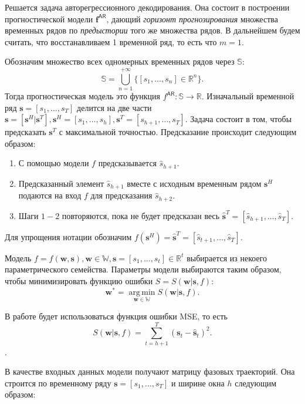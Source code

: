 \documentclass[12pt, twoside]{article}
\DeclareMathOperator*{\argmin}{arg\,min}
\begin{document}
\begin{comment}
\end{comment}

Решается задача авторегрессионного декодирования. Она состоит в построении прогностической модели $\mathbf{f}^{\mathsf{AR}}$, дающий \textit{горизонт прогнозирования} множества временных рядов по \textit{предыстории} того же множества рядов. В дальнейшем будем считать, что восстанавливаем 1 временной ряд, то есть что $m=1$.

Обозначим множество всех одномерных временных рядов через $\mathbb{S}$: \[\mathbb{S} = \bigcup\limits_{n=1}^{+\infty}\{[s_1, \dots, s_n] \in \mathbb{R}^{n}\}.\] Тогда прогностическая модель это функция $f^{\mathsf{AR}}: \mathbb{S} \to \mathbb{R}$. Изначальный временной ряд $\mathbf{s} = [s_1, \dots, s_T]$ делится на две части $\mathbf{s} = [\mathbf{s}^H|\mathbf{s}^T], \mathbf{s}^H = [s_1, \dots, s_h], \mathbf{s}^T = [s_{h+1}, \dots, s_T]$. Задача состоит в том, чтобы предсказать $\mathbf{s}^T$ с максимальной точностью. Предсказание происходит следующим образом:

\begin{enumerate}
    \item С помощью модели $f$ предсказывается $\hat{s}_{h+1}$.
    \item Предсказанный элемент $\hat{s}_{h+1}$ вместе с исходным временным рядом $\mathbf{s}^H$ подаются на вход $f$ для предсказания $\hat{s}_{h+2}$.
    \item Шаги $1-2$ повторяются, пока не будет предсказан весь $\hat{\mathbf{s}}^T=[\hat{s}_{h+1}, \dots, \hat{s}_{T}]$.
\end{enumerate}

Для упрощения нотации обозначим $f(\mathbf{s}^H)=\hat{\mathbf{s}}^T = [\hat{s}_{t+1}, \dots, \hat{s}_{T}]$.

Модель $f = f(\mathbf{w}, \mathbf{s}), \mathbf{w} \in \mathbb{W}, \mathbf{s}=[s_1, \dots, s_t]\in \mathbb{R}^t$ выбирается из некоего параметрического семейства.
Параметры модели выбираются таким образом, чтобы минимизировать функцию ошибки $S=S(\mathbf{w}|\mathbf{s},f)$:
$$
\mathbf{w^*} = \argmin\limits_{\mathbf{w} \in \mathbb{W}} S(\mathbf{w}|\mathbf{s},f).
$$


В работе будет использоваться функция ошибки MSE, то есть 
$$
S(\mathbf{w}|\mathbf{s},f) = \sum\limits_{t=h+1}^{T}(\mathbf{s}_t - \hat{\mathbf{s}}_t)^2.
$$.

В качестве входных данных модели получают матрицу фазовых траекторий. Она строится по временному ряду $\mathbf{s} = [s_1, \dots, s_{T}]$ и ширине окна $h$ следующим образом:
\end{document}

